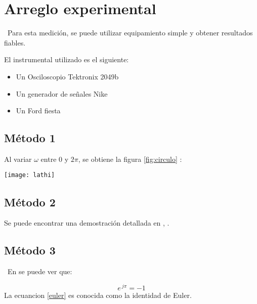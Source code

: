 \section{Arreglo experimental}
\lipsum[5]
\
Para esta medición, se puede utilizar equipamiento simple y obtener resultados fiables.

El instrumental utilizado es el siguiente:
\begin{itemize}
  \item Un Osciloscopio Tektronix 2049b
  \item Un generador de señales Nike
  \item Un Ford fiesta
\end{itemize}
\subsection{Método 1}
\lipsum[6]
Al variar $\omega$ entre $0$ y $2 \pi$, se obtiene la figura \ref{fig:circulo} :

\begin{figurehere}
 \centering
 \texttt{[image: lathi]}
 \label{fig:circulo}
\end{figurehere}

\subsection{Método 2} %
\lipsum[7]
Se puede encontrar una demostración detallada en \cite{Sh:575} , \cite{Sh:572}.
\subsection{Método 3} %
\
\lipsum[8] En \cite{webster} se puede ver que:

\begin{equation}
 e^{ \ j  \pi} = -1
 \label{euler}
\end{equation}
La ecuancion \ref{euler} es conocida como la identidad de Euler.
